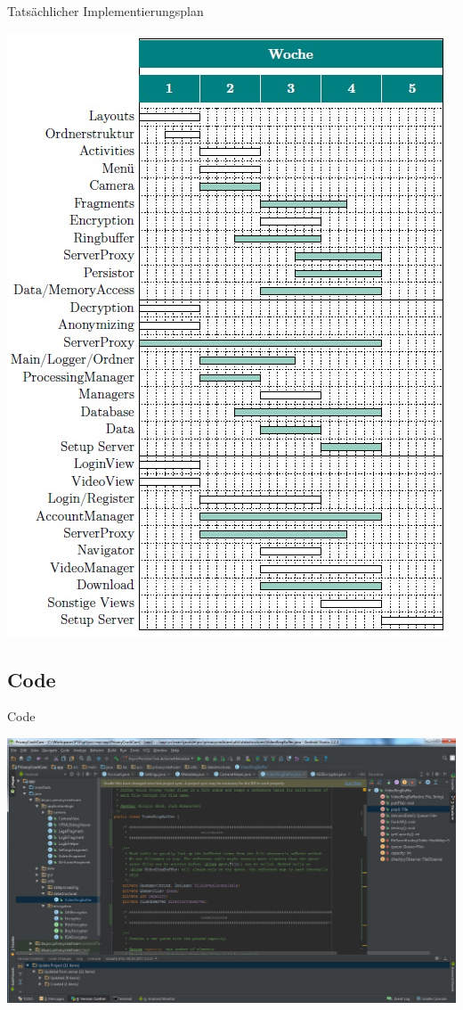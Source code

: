 \documentclass[19pt]{beamer}
\begin{document}
\begin{frame}{Tatsächlicher Implementierungsplan}
\begin{center}
\includegraphics[scale=0.4]{resources/ImpPlanPost.jpg}
\end{center}
\end{frame}

\subsection{Code}
\begin{frame}{Code}
\begin{center}
\includegraphics[scale=0.3]{resources/Code.jpg}
\end{center}
\end{frame}
\end{document}

